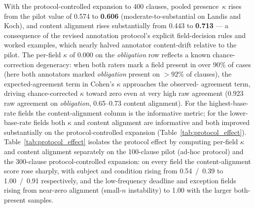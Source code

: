\documentclass{article}
\begin{document}
\noindent
With the protocol-controlled expansion to 400 clauses, pooled
presence~$\kappa$ rises from the pilot value of 0.574 to
\textbf{0.606} (moderate-to-substantial on Landis and Koch), and
content alignment rises substantially from 0.443 to \textbf{0.713}
--- a consequence of the revised annotation protocol's explicit
field-decision rules and worked examples, which nearly halved
annotator content-drift relative to the pilot.
The per-field $\kappa$ of 0.000 on the \textit{obligation} row
reflects a known chance-correction degeneracy: when both raters
mark a field present in over 90\% of cases (here both annotators
marked \textit{obligation} present on $> 92\%$ of clauses), the
expected-agreement term in Cohen's $\kappa$ approaches the observed-
agreement term, driving chance-corrected $\kappa$ toward zero even
at very high raw agreement (0.923 raw agreement on \textit{obligation},
0.65--0.73 content alignment). For the highest-base-rate fields the
content-alignment column is the informative metric; for the
lower-base-rate fields both $\kappa$ and content alignment are
informative and both improved substantially on the protocol-controlled
expansion (Table~\ref{tab:protocol_effect}).
Table~\ref{tab:protocol_effect} isolates the protocol effect by
computing per-field $\kappa$ and content alignment separately on
the 100-clause pilot (ad-hoc protocol) and the 300-clause
protocol-controlled expansion: on every field the content-alignment
score rose sharply, with subject and condition rising from
0.54~/~0.39 to 1.00~/~0.91 respectively, and the low-frequency
deadline and exception fields rising from near-zero alignment
(small-$n$ instability) to 1.00 with the larger both-present samples.
\end{document}
